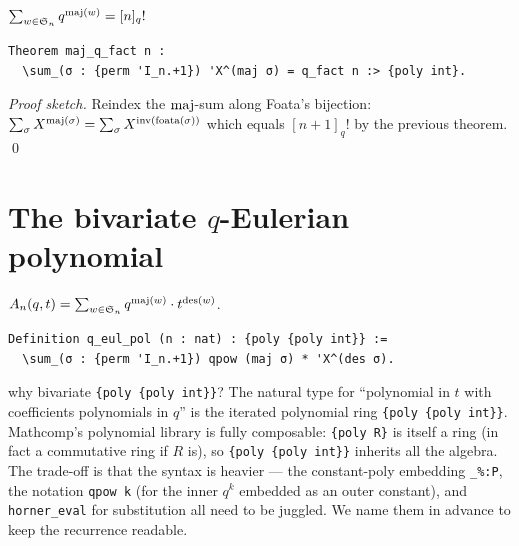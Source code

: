 \begin{theorem}
  $\sum_{w \in \mathfrak{S}_{n}} q^{\mathrm{maj}(w)} = [n]_q!$
\end{theorem}

\begin{lstlisting}[language=Rocq]
Theorem maj_q_fact n :
  \sum_(σ : {perm 'I_n.+1}) 'X^(maj σ) = q_fact n :> {poly int}.
\end{lstlisting}


\noindent
\emph{Proof sketch.} Reindex the $\mathrm{maj}$-sum along Foata's bijection:
$\sum_\sigma X^{\mathrm{maj}(\sigma)} = \sum_\sigma X^{\mathrm{inv}(\mathrm{foata}(\sigma))}$
which equals $[n+1]_q!$ by the previous theorem. \qed

\section{The bivariate $q$-Eulerian polynomial}

\begin{definition}
  $A_n(q, t) = \sum_{w \in \mathfrak{S}_{n}} q^{\mathrm{maj}(w)} \cdot t^{\mathrm{des}(w)}$.
\end{definition}

\begin{lstlisting}[language=Rocq]
Definition q_eul_pol (n : nat) : {poly {poly int}} :=
  \sum_(σ : {perm 'I_n.+1}) qpow (maj σ) * 'X^(des σ).
\end{lstlisting}


\begin{sidebar}{why bivariate \texttt{\{poly \{poly int\}\}}?}
The natural type for ``polynomial in $t$ with coefficients
polynomials in $q$'' is the iterated polynomial ring
\texttt{\{poly \{poly int\}\}}. Mathcomp's polynomial library is
fully composable: \texttt{\{poly R\}} is itself a ring (in fact a
commutative ring if $R$ is), so \texttt{\{poly \{poly int\}\}}
inherits all the algebra. The trade-off is that the syntax is
heavier --- the constant-poly embedding \texttt{\_\%:P}, the
notation \texttt{qpow k} (for the inner $q^k$ embedded as an outer
constant), and \texttt{horner\_eval} for substitution all need to
be juggled. We name them in advance to keep the recurrence
readable.
\end{sidebar}

